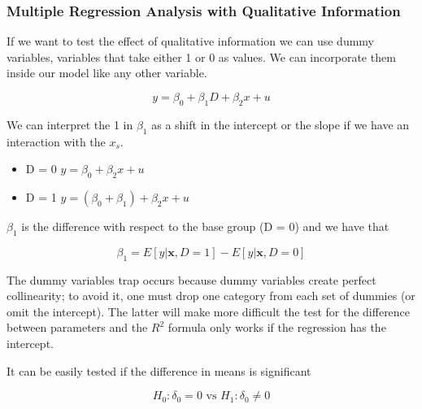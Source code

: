 \subsubsection{Multiple Regression Analysis with Qualitative Information}
If we want to test the effect of qualitative information we can use dummy variables, variables that take either 1 or 0 as values. We can incorporate them inside our model like any other variable. 

\vspace{10pt}

\[
y = \beta_0 + \beta_1D +\beta_2x +u
\]

\vspace{10pt}

We can interpret the 1 in $\beta_1$ as a shift in the intercept or the slope if we have an interaction with the $x_s$.

\vspace{10pt}

\begin{itemize}
    \item D = 0 \ra $y=\beta_0 + \beta_2x +u$
    \item D = 1 \ra $ y = (\beta_0 + \beta_1) + \beta_2x + u$
\end{itemize}

\vspace{10pt}

$\beta_1$ is the difference with respect to the base group (D = 0) and we have that

\vspace{10pt}

\[
\beta_1 = E[y|\textbf{x}, D=1] - E[y|\textbf{x}, D=0]
\]

\vspace{10pt}

The dummy variables trap occurs because dummy variables create perfect collinearity; to avoid it, one must drop one category from each set of dummies (or omit the intercept). The latter will make more difficult the test for the difference between parameters and the $R^2$ formula only works if the regression has the intercept.

\vspace{10pt}

It can be easily tested if the difference in means is significant

\vspace{10pt}

\[
H_0:\delta_0 = 0\text{ vs }H_1:\delta_0 \ne 0
\]

